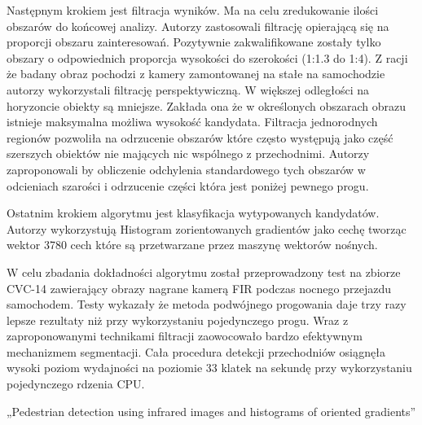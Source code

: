 Następnym krokiem jest filtracja wyników. Ma na celu zredukowanie ilości obszarów do końcowej analizy. Autorzy zastosowali filtrację opierającą się na proporcji obszaru zainteresowań. Pozytywnie zakwalifikowane zostały tylko obszary o odpowiednich proporcja wysokości do szerokości (1:1.3 do 1:4). Z racji że badany obraz pochodzi z kamery zamontowanej na stałe na samochodzie autorzy wykorzystali filtrację perspektywiczną. W większej odległości na horyzoncie obiekty są mniejsze. Zakłada ona że w określonych obszarach obrazu istnieje maksymalna możliwa wysokość kandydata. Filtracja jednorodnych regionów pozwoliła na odrzucenie obszarów które często występują jako część szerszych obiektów nie mających nic wspólnego z przechodnimi. Autorzy zaproponowali by obliczenie odchylenia standardowego tych obszarów w odcieniach szarości i odrzucenie części która jest poniżej pewnego progu. 

Ostatnim krokiem algorytmu jest klasyfikacja wytypowanych kandydatów. Autorzy wykorzystują Histogram zorientowanych gradientów jako cechę tworząc wektor 3780 cech które są przetwarzane przez maszynę wektorów nośnych.

W celu zbadania dokładności algorytmu został przeprowadzony test na zbiorze CVC-14 zawierający obrazy nagrane kamerą FIR podczas nocnego przejazdu samochodem. Testy wykazały że metoda podwójnego progowania daje trzy razy lepsze rezultaty niż przy wykorzystaniu pojedynczego progu. Wraz z zaproponowanymi technikami filtracji zaowocowało bardzo efektywnym mechanizmem segmentacji. Cała procedura detekcji przechodniów osiągnęła wysoki poziom wydajności na poziomie 33 klatek na sekundę przy wykorzystaniu pojedynczego rdzenia CPU.


„Pedestrian detection using infrared images and histograms of oriented gradients”

